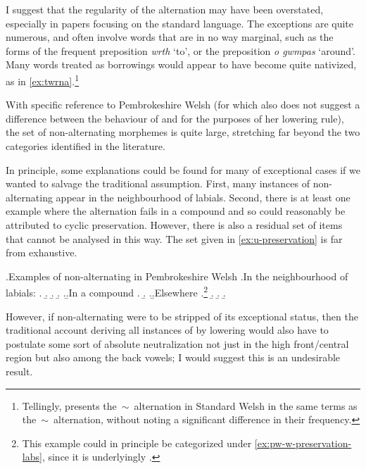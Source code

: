 I suggest that the regularity of the \alternation{[u]}{[ə]} alternation may have been overstated, especially in papers focusing on the standard language. The exceptions are quite numerous, and often involve words that are in no way marginal, such as the forms of the frequent preposition \emph{wrth} `to', or the preposition \emph{o gwmpas} `around'. Many words treated as borrowings would appear to have become quite nativized, as in \cref{ex:twrna}.\footnote{Tellingly, \citet{awbery09:_welsh} presents the \ipa{[u]}\,$\sim$\,\ipa{[ə]} alternation in Standard Welsh in the same terms as the \ipa{[i]}\,$\sim$\,\ipa{[ə]} alternation, without noting a significant difference in their frequency.}

With specific reference to Pembrokeshire Welsh (for which \citealp{awbery86:_pembr_welsh} also does not suggest a difference between the behaviour of \ipa{[u]} and \ipa{[i]} for the purposes of her lowering rule), the set of non-alternating morphemes is quite large, stretching far beyond the two categories identified in the literature.

In principle, some explanations could be found for many of exceptional cases if we wanted to salvage the traditional assumption. First, many instances of non-alternating \ipa{[u]} appear in the neighbourhood of labials. Second, there is at least one example where the alternation fails in a compound and so could reasonably be attributed to cyclic preservation. However, there is also a residual set of items that cannot be analysed in this way. The set given in \cref{ex:u-preservation} is far from exhaustive.

\ex.\label{ex:u-preservation}Examples of non\hyp alternating \ipa{[u]} in Pembrokeshire Welsh
\a.\label{ex:pw-w-preservation-labs}In the neighbourhood of labials:
\a.
\b.
\b.
\b.
\z.\b.In a compound
\a.
\b.
\z.\b.Elsewhere
\a.\footnote{This example could in principle be categorized under \ref{ex:pw-w-preservation-labs}, since it is underlyingly .}
\b.
\b.
\b.

However, if non\hyp alternating \ipa{[u]} were to be stripped of its exceptional status, then the traditional account deriving all instances of \ipa{[ə]} by lowering would also have to postulate some sort of absolute neutralization not just in the high front\fshyp central region but also among the back vowels; I would suggest this is an undesirable result.

